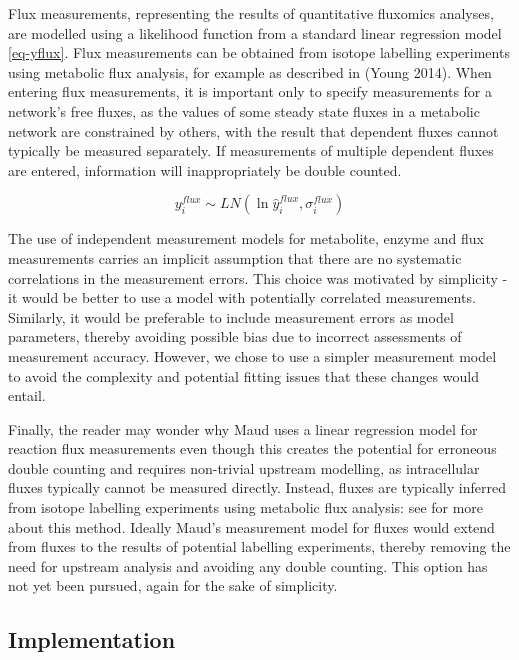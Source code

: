 \documentclass[journal=asbcd6,manuscript=article,layout=traditional]{achemso}
\begin{document}
Flux measurements, representing the results of quantitative fluxomics
analyses, are modelled using a likelihood function from a standard
linear regression model \eqref{eq-yflux}. Flux measurements can be
obtained from isotope labelling experiments using metabolic flux
analysis, for example as described in (Young 2014). When entering flux
measurements, it is important only to specify measurements for a
network's free fluxes, as the values of some steady state fluxes in a
metabolic network are constrained by others, with the result that
dependent fluxes cannot typically be measured separately. If
measurements of multiple dependent fluxes are entered, information will
inappropriately be double counted.

\begin{equation}
y_i^{flux} \sim LN(\ln{\hat{y}_i^{flux}}, \sigma_i^{flux})\label{eq-yflux}
\end{equation}

The use of independent measurement models for metabolite, enzyme and
flux measurements carries an implicit assumption that there are no
systematic correlations in the measurement errors. This choice was
motivated by simplicity - it would be better to use a model with
potentially correlated measurements. Similarly, it would be preferable
to include measurement errors as model parameters, thereby avoiding
possible bias due to incorrect assessments of measurement accuracy.
However, we chose to use a simpler measurement model to avoid the
complexity and potential fitting issues that these changes would entail.

Finally, the reader may wonder why Maud uses a linear regression model
for reaction flux measurements even though this creates the potential
for erroneous double counting and requires non-trivial upstream
modelling, as intracellular fluxes typically cannot be measured
directly. Instead, fluxes are typically inferred from isotope labelling
experiments using metabolic flux analysis: see
\citet{daiUnderstandingMetabolismFlux2017} for more about this method.
Ideally Maud's measurement model for fluxes would extend from fluxes to
the results of potential labelling experiments, thereby removing the
need for upstream analysis and avoiding any double counting. This option
has not yet been pursued, again for the sake of simplicity.

\hypertarget{implementation}{%
\subsection{Implementation}\label{implementation}}
\end{document}
